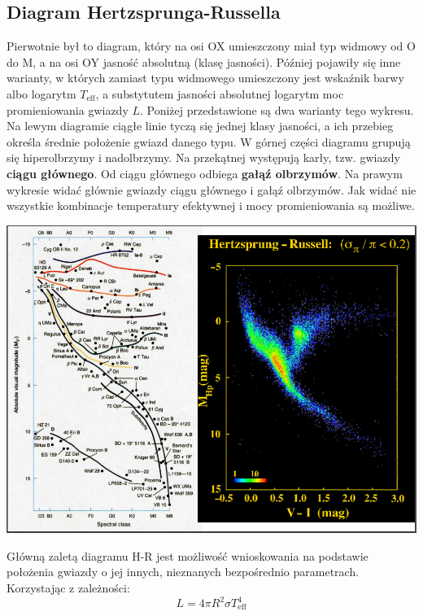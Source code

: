 \documentclass[../index.tex]{subfiles}
\begin{document}
        \subsection{Diagram Hertzsprunga-Russella}
            Pierwotnie był to diagram, który na osi OX umieszczony miał typ widmowy od O do M, a na osi OY jasność absolutną (klasę jasności). Później pojawiły się inne warianty, w których zamiast typu widmowego umieszczony jest wskaźnik barwy albo logarytm \(T_\text{eff}\), a substytutem jasności absolutnej logarytm moc promieniowania gwiazdy \(L\). Poniżej przedstawione są dwa warianty tego wykresu. Na lewym diagramie ciągłe linie tyczą się jednej klasy jasności, a ich przebieg określa średnie położenie gwiazd danego typu. W górnej części diagramu grupują się hiperolbrzymy i nadolbrzymy. Na przekątnej występują karły, tzw. gwiazdy \textbf{ciągu głównego}. Od ciągu głównego odbiega \textbf{gałąź olbrzymów}. Na prawym wykresie widać głównie gwiazdy ciągu głównego i gałąź olbrzymów. Jak widać nie wszystkie kombinacje temperatury efektywnej i mocy promieniowania są możliwe.
            \begin{center}
                \includegraphics[width=16cm]{images/Hertzsprung-Russell.png}
            \end{center}
            Główną zaletą diagramu H-R jest możliwość wnioskowania na podstawie położenia gwiazdy o jej innych, nieznanych bezpośrednio parametrach.\\
            Korzystając z zależności:
            \begin{equation}
                L = 4\pi R^2 \sigma T_\text{eff}^{4}
            \end{equation}
\end{document}
